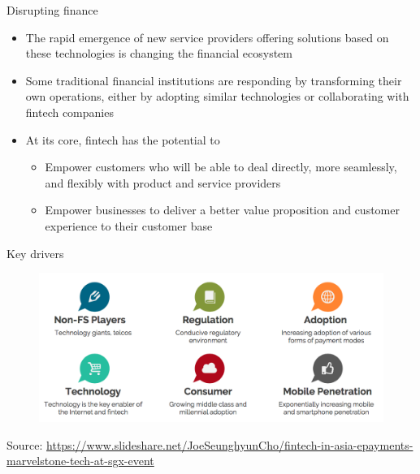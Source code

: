 \documentclass[9pt]{beamer}
\begin{document}

\begin{frame}{Disrupting finance}
	\begin{itemize}
		\item The rapid emergence of new service providers offering solutions based on these technologies is changing the financial ecosystem
		\item Some traditional financial institutions are responding by transforming their own operations, either by adopting similar technologies or collaborating with fintech companies
		\item At its core, fintech has the potential to
		\begin{itemize}
			\item Empower customers who will be able to deal directly, more seamlessly, and flexibly with product and service providers
			\item Empower businesses to deliver a better value proposition and customer experience to their customer base
		\end{itemize}
	\end{itemize}
\end{frame}


\begin{frame}{Key drivers}
	\begin{figure}[]
		\centering
		\includegraphics  [scale=0.5]{Images/drivers}
	\end{figure}
	\begin{tiny}
		Source: \href{https://www.slideshare.net/JoeSeunghyunCho/fintech-in-asia-epayments-marvelstone-tech-at-sgx-event}{https://www.slideshare.net/JoeSeunghyunCho/fintech-in-asia-epayments-marvelstone-tech-at-sgx-event}
	\end{tiny}
\end{frame}
\end{document}
